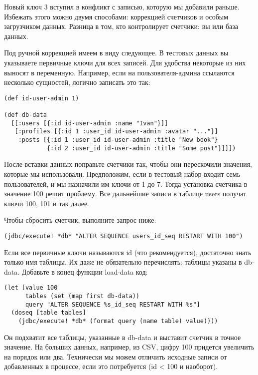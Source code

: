Новый ключ 3 вступил в конфликт с записью, которую мы добавили раньше. Избежать
этого можно двумя способами: коррекцией счетчиков и особым загрузчиком
данных. Разница в том, кто контролирует счетчики: вы или база данных.

Под ручной коррекцией имеем в виду следующее. В тестовых данных вы указываете
первичные ключи для всех записей. Для удобства некоторые из них выносят в
переменную. Например, если на пользователя-админа ссылаются несколько сущностей,
логично записать это так:

\begin{verbatim}
(def id-user-admin 1)

(def db-data
  [[:users [{:id id-user-admin :name "Ivan"}]]
   [:profiles [{:id 1 :user_id id-user-admin :avatar "..."}]
    :posts [{:id 1 :user_id id-user-admin :title "New book"}
            {:id 2 :user_id id-user-admin :title "Some post"}]]])
\end{verbatim}

После вставки данных поправьте счетчики так, чтобы они перескочили значения,
которые мы использовали. Предположим, если в тестовый набор входит семь
пользователей, и мы назначили им ключи от 1 до 7. Тогда установка счетчика в
значение 100 решит проблему. Все дальнейшие записи в таблице users получат ключи
100, 101 и так далее.

Чтобы сбросить счетчик, выполните запрос ниже:

\begin{verbatim}
(jdbc/execute! *db* "ALTER SEQUENCE users_id_seq RESTART WITH 100")
\end{verbatim}

Если все первичные ключи называются id (что рекомендуется), достаточно знать
только имя таблицы. Их даже не обязательно перечислять: таблицы указаны в
db-data. Добавьте в конец функции load-data код:

\begin{verbatim}
(let [value 100
      tables (set (map first db-data))
      query "ALTER SEQUENCE %s_id_seq RESTART WITH %s"]
  (doseq [table tables]
    (jdbc/execute! *db* (format query (name table) value))))
\end{verbatim}

Он подхватит все таблицы, указанные в db-data и выставит счетчик в точное
значение. На больших данных, например, из CSV, цифру 100 придется увеличить на
порядок или два. Технически мы можем отличить исходные записи от добавленных в
процессе, если это потребуется (id < 100 и наоборот).

